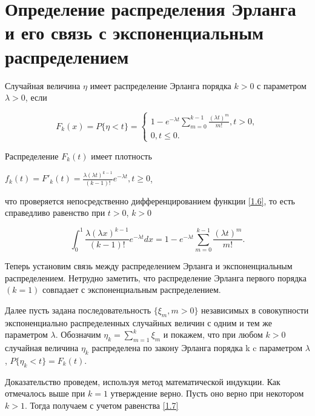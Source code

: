 \section{Определение распределения Эрланга и его связь с экспоненциальным распределением}

Случайная величина $\eta$ имеет распределение Эрланга порядка $k>0$ с параметром $\lambda>0$, если


	\begin{equation}
	\label {1.6}
	F_k(x) = P \{\eta<t\} = \begin{cases}1-e^{-\lambda t} \sum_{m=0}^{k-1}\frac{(\lambda t)^m}{m!},t>0,\\0,t\leq0.\end{cases}
	\end{equation} 


Распределение $F_k(t)$ имеет плотность


\begin{center}
	$ f_k(t)= F'_k(t) = \frac{\lambda(\lambda t)^{k-1}}{(k-1)!}e^{-\lambda t},t\geq0$,
\end{center}


что проверяется непосредственно дифференцированием функции \ref{1.6}, то есть справедливо равенство при $t>0$, $k>0$

\begin{center}
	\begin{equation}
	\label{1.7}
	\int_{0}^{1}\frac{\lambda(\lambda x)^{k-1}}{(k-1)!}e^{-\lambda t}dx = 1-e^{-\lambda t} \sum_{m=0}^{k-1}\frac{(\lambda t)^m}{m!}.
	\end{equation}
\end{center} 


Теперь установим связь между распределением Эрланга и экспоненциальным распределением. Нетрудно заметить, что распределение Эрланга первого порядка $(k=1)$ совпадает с экспоненциальным распределением.


Далее пусть задана последовательность $\{\xi_m, m>0\}$ независимых  в совокупности экспоненциально распределенных случайных величин с одним и тем же параметром $\lambda$. Обозначим $\eta_k = \sum_{m=1}^{k}\xi_m$ и покажем, что при любом $k>0$ случайная величина $\eta_k$ распределена по закону Эрланга порядка k c параметром $\lambda$, $P\{\eta_k<t\} = F_k(t)$.

Доказательство проведем, используя метод математической индукции. Как отмечалось выше при $k=1$ утверждение верно. Пусть оно верно при некотором $k>1$. Тогда получаем с учетом равенства \ref{1.7}

